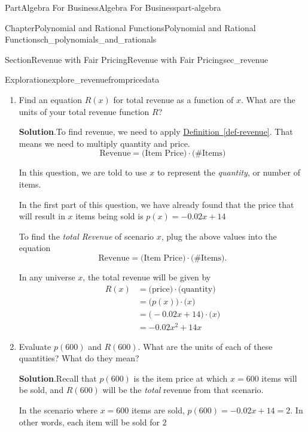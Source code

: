 \documentclass[oneside,10pt,]{tufte-book}
\newcommand{\blocktitlefont}{\relax}
\newcommand{\xreffont}{\relax}
\numberwithin{equation}{chapter}
\begin{document}
\begin{partptx}{Part}{Algebra For Business}{}{Algebra For Business}{}{}{part-algebra}
\begin{chapterptx}{Chapter}{Polynomial and Rational Functions}{}{Polynomial and Rational Functions}{}{}{ch_polynomials_and_rationals}
\begin{sectionptx}{Section}{Revenue with Fair Pricing}{}{Revenue with Fair Pricing}{}{}{sec_revenue}
\begin{exploration}{Exploration}{}{explore_revenuefrompricedata}
\begin{enumerate}[font=\bfseries,label=(\alph*),ref=\alph*]
\begin{equation*}
p(x) = -0.02 (x-100) + 12 = \dots = -0.02x + 14
\end{equation*}
%
\item{}Find an equation \(R(x)\) for total revenue as a function of \(x\). What are the units of your total revenue function \(R\)?%
\par\smallskip%
\noindent\textbf{\blocktitlefont Solution}.\hypertarget{explore_revenuefrompricedata-3-2}{}\quad{}To find revenue, we need to apply \hyperref[def-revenue]{Definition~{\xreffont\ref{def-revenue}}}.  That means we need to multiply quantity and price.%
\begin{equation*}
\text{Revenue} = \Big(\text{Item Price}\Big) \cdot \Big(\text{\# Items}\Big)
\end{equation*}
%
\par
In this question, we are told to use \(x\) to represent the \emph{quantity}, or number of items.%
\par
In the first part of this question, we have already found that the price that will result in \(x\) items being sold is \(p(x) = -0.02x + 14\)%
\par
To find the \emph{total Revenue} of scenario \(x\), plug the above values into the equation%
\begin{equation*}
\text{Revenue} = \Big(\text{Item Price}\Big) \cdot \Big(\text{\# Items}\Big)\text{.}
\end{equation*}
%
\par
In any universe \(x\), the total revenue will be given by%
\begin{equation*}
\begin{aligned}
R(x)  &=  \Big(\text{price}\Big) \cdot \Big(\text{quantity}\Big) \\
&=  \Big(p(x) \Big) \cdot \Big(x\Big) \\
&=  \Big( -0.02x + 14\Big)\cdot \Big(x\Big) \\ 
&=   -0.02x^2 + 14x\end{aligned}
\end{equation*}
%
\item{}Evaluate \(p(600)\) and \(R(600)\). What are the units of each of these quantities? What do they mean?%
\par\smallskip%
\noindent\textbf{\blocktitlefont Solution}.\hypertarget{explore_revenuefrompricedata-4-2}{}\quad{}Recall that \(p(600)\) is the item price at which \(x=600\) items will be sold, and \(R(600)\) will be the \emph{total} revenue from that scenario.%
\par
In the scenario where \(x=600\) items are sold, \(p(600) = -0.02x + 14 = 2\).  In other words, each item will be sold for \textdollar{}\(2\)%

\end{enumerate}
\end{exploration}
\end{sectionptx}
\end{chapterptx}
\end{partptx}
\end{document}
